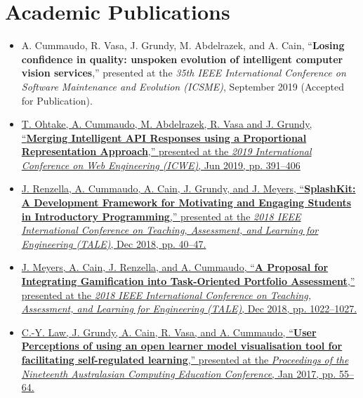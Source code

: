 \section{Academic Publications}

\medskip
{
\small
\begin{itemize}
  \item A. Cummaudo, R. Vasa, J. Grundy, M. Abdelrazek, and A. Cain, ``\textbf{Losing confidence in quality: unspoken evolution of intelligent computer vision services},” presented at the \textit{35th IEEE International Conference on Software Maintenance and Evolution (ICSME)}, September 2019 (Accepted for Publication).\\
  \item \href{https://doi.org/10.1007/978-3-030-19274-7_28}{T. Ohtake, A. Cummaudo, M. Abdelrazek, R. Vasa and J. Grundy, ``\textbf{Merging Intelligent API Responses using a Proportional Representation Approach},'' presented at the \textit{2019 International Conference on Web Engineering (ICWE)}, Jun 2019, pp. 391--406}\\
  \item \href{http://doi.org/10.1109/TALE.2018.8615203}{J. Renzella, A. Cummaudo, A. Cain, J. Grundy, and J. Meyers, ``\textbf{SplashKit: A Development Framework for Motivating and Engaging Students in Introductory Programming},'' presented at the \textit{2018 IEEE International Conference on Teaching, Assessment, and Learning for Engineering (TALE)}, Dec 2018, pp. 40--47.}\\
  \item \href{http://doi.org/10.1109/TALE.2018.8615174}{J. Meyers, A. Cain, J. Renzella, and A. Cummaudo, ``\textbf{A Proposal for Integrating Gamification into Task-Oriented Portfolio Assessment},'' presented at the \textit{2018 IEEE International Conference on Teaching, Assessment, and Learning for Engineering (TALE)}, Dec 2018, pp. 1022--1027.}\\
  \item \href{http://doi.org/10.1145/3013499.3013502}{C.-Y. Law, J. Grundy, A. Cain, R. Vasa, and A. Cummaudo, ``\textbf{User Perceptions of using an open learner model visualisation tool for facilitating self-regulated learning},'' presented at the \textit{Proceedings of the Nineteenth Australasian Computing Education Conference}, Jan 2017, pp. 55--64.}
\end{itemize}
}


